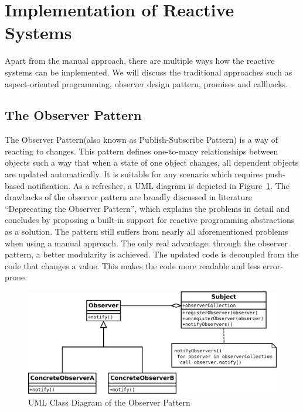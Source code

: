\section {Implementation of Reactive Systems}
Apart from the manual approach, there are multiple ways how the reactive systems can be implemented. We will discuss the traditional approaches such as aspect-oriented programming, observer design pattern, promises and callbacks. 
	
\subsection{The Observer Pattern}
The Observer Pattern(also known as Publish-Subscribe Pattern)\cite{understandingObserverPattern} is a way of reacting to changes. 
This pattern defines one-to-many relationships between objects such a way that when a state of one object changes, all dependent objects are updated automatically. 
It is suitable for any scenario which requires push-based notification\cite{understandingObserverPattern}. 
As a refresher, a UML diagram is depicted in Figure~\ref{fig:observer-uml}. The drawbacks of the observer pattern are broadly discussed in literature  ``Deprecating the Observer Pattern'', which explains the problems in detail and concludes by proposing a built-in support for reactive programming abstractions as a solution\cite{deprecatingTheObserverPattern}. 
The pattern still suffers from nearly all aforementioned problems when using a manual approach. 
The only real advantage: through the observer pattern, a better modularity is achieved. 
The updated code is decoupled from the code that changes a value. 
This makes the code more readable and less error-prone. 

\begin{figure}[!h]
	\centering
	\includegraphics[scale=0.5,trim=0 0 0 0]{images/observer-uml.png}
	\caption{UML Class Diagram of the Observer Pattern}
	\label{fig:observer-uml}
\end{figure}

